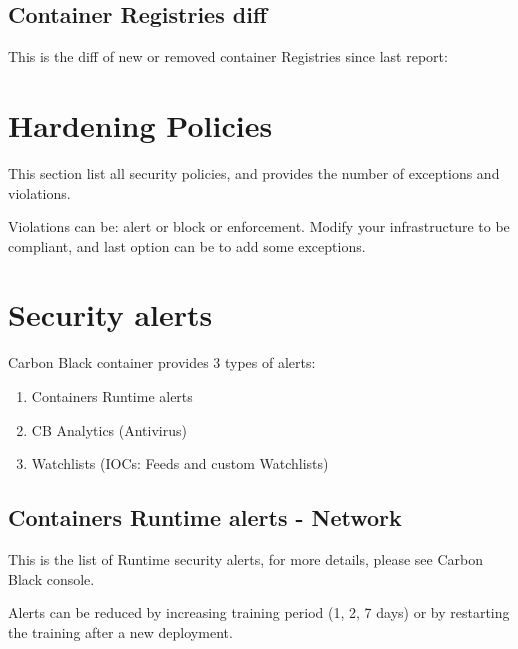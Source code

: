 
\vskip15pt

\subsection{Container Registries diff}
This is the diff of new or removed container Registries since last report:
\vskip10pt


\section{Hardening Policies}

This section list all security policies, and provides the number of exceptions and violations.



\begin{importantblock}
	Violations can be: alert or block or \gls{enforcement}. Modify your infrastructure to be compliant, and last option can be to add some exceptions.
\end{importantblock}

\section{Security alerts}

Carbon Black container provides 3 types of alerts:
\begin{enumerate}
  \item Containers Runtime alerts
  \item CB Analytics (Antivirus)
  \item Watchlists (IOCs: Feeds and custom Watchlists)
\end{enumerate}

\subsection{Containers Runtime alerts - Network}
\noindent


\vskip10pt

This is the list of Runtime security alerts, for more details, please see Carbon Black console.
\vskip10pt



\begin{tipblock}
	Alerts can be reduced by increasing training period (1, 2, 7 days) or by restarting the training after a new deployment.
\end{tipblock}

